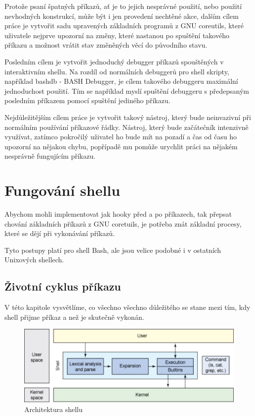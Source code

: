 \documentclass[thesis=M,czech]{FITthesis}[2012/06/26]
\begin{document}
Protože psaní špatných příkazů, ať je to jejich nesprávné použití, nebo použití nevhodných konstrukcí, může být i jen provedení nechtěné akce, dalším cílem práce je vytvořit sadu upravených základních programů z GNU coreutils, které uživatele nejprve upozorní na změny, které nastanou po spuštění takového příkazu a možnost vrátit stav změněných věcí do původního stavu.

Posledním cílem je vytvořit jednoduchý debugger příkazů spouštěných v interaktivním shellu. Na rozdíl od normálních debuggerů pro shell skripty, například bashdb - BASH Debugger, je cílem takového debuggeru maximální jednoduchost použití. Tím se například myslí spuštění debuggeru s předepsaným posledním příkazem pomocí spuštění jediného příkazu.

Nejdůležitějším cílem práce je vytvořit takový nástroj, který bude neinvazivní při normálním používání příkazové řádky. Nástroj, který bude začátečník intenzivně využívat, zatímco pokročilý uživatel ho bude mít na pozadí a čas od času ho upozorní na nějakou chybu, popřípadě mu pomůže urychlit práci na nějakém nesprávně fungujícím příkazu.

%
%
%
\section{Fungování shellu}

Abychom mohli implementovat jak hooky před a po příkazech, tak přepsat chování základních příkazů z GNU coretuils, je potřeba znát základní procesy, které se dějí při vykonávání příkazů.

Tyto postupy platí pro shell Bash, ale jsou velice podobné i v ostatních Unixových shellech.

%
%
%
\subsection{Životní cyklus příkazu}

V této kapitole vysvětlíme, co všechno všechno důležitého se stane mezi tím, kdy shell přijme příkaz a než je skutečně vykonán.

\begin{figure}[htb]\centering
	\includegraphics[width=\textwidth]{./images/shell_arch2}
	\caption{Architektura shellu}
	\label{fig:shell_arch}
\end{figure}
\end{document}
